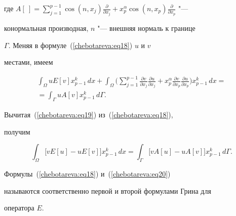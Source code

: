 где $A\left[~\right] = \sum\limits_{j = 1}^{p - 1} {\cos \left(


{n, x_j } \right)\frac{\partial }{\partial x_j }} + x_p^\alpha \cos


\left( {n, x_p } \right)\frac{\partial }{\partial x_p }$ "---


конормальная производная,  $n$ "--- внешняя нормаль к границе


$\Gamma$. Меняя в формуле~(\ref{chebotareva:eq18}) $u$ и $v$


местами,  имеем


\begin{multline}


\label{chebotareva:eq19} \int_\Omega uE\left[ v


\right]x_{p - 1}^k\, dx + \int_\Omega \Biggl(


\sum\limits_{j = 1}^{p - 1} \frac{\partial v}{\partial x_j


}\frac{\partial u}{\partial x_j } + x_p^\alpha \frac{\partial


v}{\partial x_p }\frac{\partial u}{\partial x_p }  \Biggr)x_{p -


1}^k \,dx = \\= \int_\Gamma {uA\left[ v \right]} x_{p - 1}^k\,


d\Gamma.


\end{multline}


Вычитая~(\ref{chebotareva:eq19}) из~(\ref{chebotareva:eq18}), 


получим


\begin{equation}


\label{chebotareva:eq20} \int_\Omega \bigr[ vE\left[ u


\right] - uE\left[ v \right] \bigl]x_{p - 1}^k \, dx =


\int_\Gamma \bigl[ vA\left[ u \right] - uA\left[ v


\right] \bigr] x_{p - 1}^k \,d\Gamma .


\end{equation}





Формулы~(\ref{chebotareva:eq18}) и~(\ref{chebotareva:eq20})


называются соответственно первой и второй формулами Грина для


оператора $E$.





